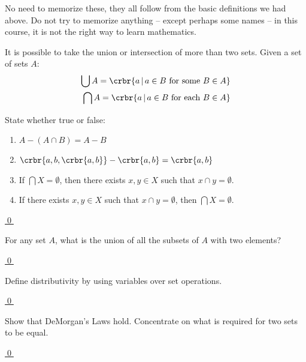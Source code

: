 \documentclass[11pt]{article}
\begin{document}
{%

\item No need to memorize these, they all follow from the basic definitions we
had above. Do not try to memorize anything -- except perhaps some names -- in
this course, it is not the right way to
learn mathematics.  

\item It is possible to take the union or intersection of more than two sets. Given a set of sets $A$:
\begin{align*}
	\bigcup A = \crbr{a\, |\, a \in B\text{ for some }B \in A}\\
	\bigcap A = \crbr{a\, |\, a \in B\text{ for each }B \in A}
\end{align*}

\hrulefill

\begin{uexercise}\label{ex-bigOp}
State whether true or false:
\begin{enumerate}

\item\label{ex-bigOp-x}
$A - (A \cap B) = A - B$
\item\label{ex-bigOp-y}
$\crbr{a,b,\crbr{a,b}} - \crbr{a,b} = \crbr{a,b}$

\item\label{ex-bigOp-a} If $\bigcap X = \emptyset$, then there exists $x,y\in X$ such that $x\cap
y = \emptyset$.
\item\label{ex-bigOp-b} If there exists $x,y\in X$ such that $x\cap
y = \emptyset$, then $\bigcap X = \emptyset$.
\end{enumerate}

\hyperlink{ex-bigOp-sol}{\qed}
\end{uexercise}

\begin{uexercise}\label{ex-tsubs}
For any set $A$, what is the union of all the subsets of $A$  with two
elements?

\hyperlink{ex-tsubs-sol}{\qed}
\end{uexercise}

\begin{uexercise}[*] \label{ex-dist} 
Define distributivity by using variables over set operations.

\hyperlink{ex-dist-sol}{\qed}
\end{uexercise}

\begin{uexercise}[*] \label{ex-demorg} 
Show that DeMorgan's Laws hold.  Concentrate on what is required for
two sets to be equal.

\hyperlink{ex-demorg-sol}{\qed}
\end{uexercise}
\hrulefill
}
\end{document}
